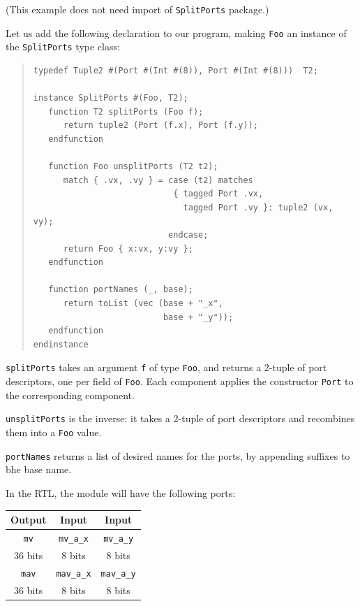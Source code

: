 \label{sec:splitports_examples_BSV_Foo_Shallow}

\hspace*{1em}

{\footnotesize (This example does not need import of {\tt SplitPorts} package.)}

Let us add the following declaration to our program, making {\tt Foo}
an instance of the {\tt SplitPorts} type class:

\begin{quote}
\begin{verbatim}
typedef Tuple2 #(Port #(Int #(8)), Port #(Int #(8)))  T2;

instance SplitPorts #(Foo, T2);
   function T2 splitPorts (Foo f);
      return tuple2 (Port (f.x), Port (f.y));
   endfunction

   function Foo unsplitPorts (T2 t2);
      match { .vx, .vy } = case (t2) matches
                            { tagged Port .vx,
                              tagged Port .vy }: tuple2 (vx, vy);
                           endcase;
      return Foo { x:vx, y:vy };
   endfunction

   function portNames (_, base);
      return toList (vec (base + "_x",
                          base + "_y"));
   endfunction
endinstance
\end{verbatim}
\end{quote}

{\tt splitPorts} takes an argument {\tt f} of type {\tt Foo}, and
returns a 2-tuple of port descriptors, one per field of {\tt Foo}.
Each component applies the constructor {\tt Port} to the corresponding
component.

{\tt unsplitPorts} is the inverse: it takes a 2-tuple of port
descriptors and recombines them into a {\tt Foo} value.

{\tt portNames} returns a list of desired names for the ports, by
appending suffixes to bhe base name.

In the RTL, the module will have the following ports:

\begin{center}
  \begin{tabular}{|c||c|c|}
    \hline
     Output &
     Input  &
     Input  \\
    \hline
     {\tt mv}       &
     {\tt mv\_a\_x} &
     {\tt mv\_a\_y} \\
     36 bits &
      8 bits &
      8 bits \\
    \hline
     {\tt mav}       &
     {\tt mav\_a\_x} &
     {\tt mav\_a\_y} \\
     36 bits &
      8 bits &
      8 bits \\
    \hline
  \end{tabular}
\end{center}

